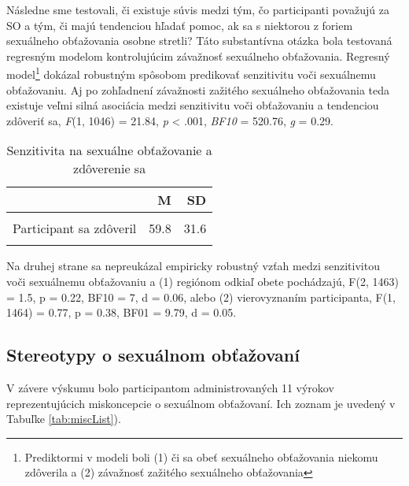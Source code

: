 \documentclass[
]{article}
\begin{document}
Následne sme testovali, či existuje súvis medzi tým, čo participanti považujú za SO a tým, či majú tendenciou hľadať pomoc, ak sa s niektorou z foriem sexuálneho obťažovania osobne stretli? Táto substantívna otázka bola testovaná regresným modelom kontrolujúcim závažnosť sexuálneho obťažovania. Regresný model\footnote{Prediktormi v modeli boli (1) či sa obeť sexuálneho obťažovania niekomu zdôverila a (2) závažnosť zažitého sexuálneho obťažovania} dokázal robustným spôsobom predikovať senzitivitu voči sexuálnemu obťažovaniu. Aj po zohľadnení závažnosti zažitého sexuálneho obťažovania teda existuje veľmi silná asociácia medzi senzitivitu voči obťažovaniu a tendenciou zdôveriť sa, \emph{F}(1, 1046) = 21.84, \emph{p} \textless{} .001, \emph{BF10} = 520.76, \emph{g} = 0.29.

\begin{table}[H]

\caption{\label{tab:unnamed-chunk-6}Senzitivita na sexuálne obťažovanie a zdôverenie sa}
\centering
\fontsize{10}{12}\selectfont
\begin{tabular}[t]{lrr}
\toprule
  & M & SD\\
\midrule
\cellcolor{gray!6}{Participant sa nezdôveril} & \cellcolor{gray!6}{49.9} & \cellcolor{gray!6}{34.4}\\
Participant sa zdôveril & 59.8 & 31.6\\
\cellcolor{gray!6}{Participant nebol obeťou obťažovania} & \cellcolor{gray!6}{56.2} & \cellcolor{gray!6}{33.8}\\
\bottomrule
\end{tabular}
\end{table}

Na druhej strane sa nepreukázal empiricky robustný vzťah medzi senzitivitou voči sexuálnemu obťažovaniu a (1) regiónom odkiaľ obete pochádzajú, F(2, 1463) = 1.5, p = 0.22, BF10 = 7, d = 0.06, alebo (2) vierovyznaním participanta, F(1, 1464) = 0.77, p = 0.38, BF01 = 9.79, d = 0.05.

\hypertarget{stereotypy-o-sexuuxe1lnom-obux165aux17eovanuxed}{%
\subsection{Stereotypy o sexuálnom obťažovaní}\label{stereotypy-o-sexuuxe1lnom-obux165aux17eovanuxed}}

V závere výskumu bolo participantom administrovaných 11 výrokov reprezentujúcich miskoncepcie o sexuálnom obťažovaní. Ich zoznam je uvedený v Tabuľke \ref{tab:miscList}).
\end{document}
